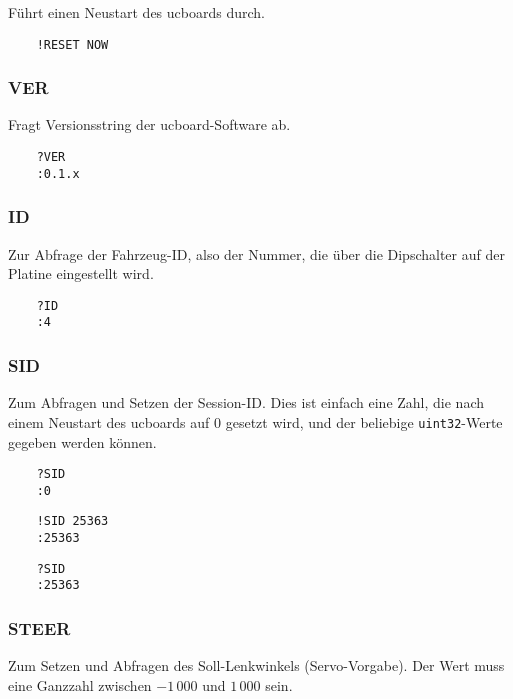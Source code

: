 Führt einen Neustart des ucboards durch.


\begin{verbatim}
	!RESET NOW
\end{verbatim}



\subsubsection{VER}

Fragt Versionsstring der ucboard-Software ab.


\begin{verbatim}
	?VER
	:0.1.x
\end{verbatim}



\subsubsection{ID}

Zur Abfrage der Fahrzeug-ID, also der Nummer, die über die Dipschalter auf der Platine eingestellt wird.


\begin{verbatim}
	?ID
	:4
\end{verbatim}


\subsubsection{SID}

Zum Abfragen und Setzen der Session-ID. Dies ist einfach eine Zahl, die nach einem Neustart des ucboards auf 0 gesetzt wird, und der beliebige \verb|uint32|-Werte gegeben werden können.


\begin{verbatim}
	?SID
	:0
\end{verbatim}

\begin{verbatim}
	!SID 25363
	:25363
\end{verbatim}

\begin{verbatim}
	?SID
	:25363
\end{verbatim}




\subsubsection{STEER}

Zum Setzen und Abfragen des Soll-Lenkwinkels (Servo-Vorgabe). Der Wert muss eine Ganzzahl zwischen $-1\,000$ und $1\,000$ sein.

